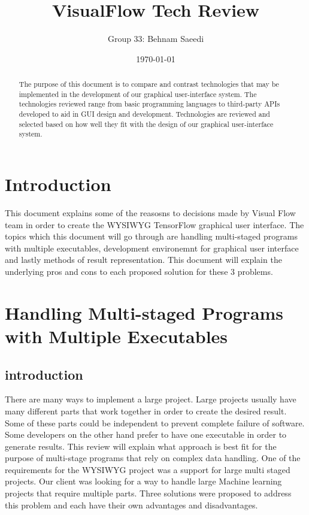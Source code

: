 \documentclass[journal,10pt,onecolumn,compsoc]{IEEEtran} \usepackage[margin=1.0in]{geometry} \usepackage{pdfpages} \usepackage{graphicx}
\title{VisualFlow Tech Review}
\author{Group 33: Behnam Saeedi}
\date{\today}
\begin{document}
\maketitle
\begin{abstract}
The purpose of this document is to compare and contrast technologies that may be implemented in the development of our graphical user-interface system. 
The technologies reviewed range from basic programming languages to third-party APIs developed to aid in GUI design and development.
Technologies are reviewed and selected based on how well they fit with the design of our graphical user-interface system.
\end{abstract}
\newpage
\tableofcontents
\newpage
\section{Introduction}
This document explains some of the reasosns to decisions made by Visual Flow team in order to create the WYSIWYG TensorFlow graphical user interface.
The topics which this document will go through are handling multi-staged programs with multiple executables, 
development environemnt for graphical user interface and lastly methods of result representation.
This document will explain the underlying pros and cons to each proposed solution for these 3 problems.

\section{Handling Multi-staged Programs with Multiple Executables}
\subsection{introduction}
There are many ways to implement a large project. 
Large projects usually have many different parts that work together in order to create the desired result. 
Some of these parts could be independent to prevent complete failure of software. 
Some developers on the other hand prefer to have one executable in order to generate results. 
This review will explain what approach is best fit for the purpose of multi-stage programs that rely on complex data handling. 
One of the requirements for the WYSIWYG project was a support for large multi staged projects. 
Our client was looking for a way to handle large Machine learning projects that require multiple parts. 
Three solutions were proposed to address this problem and each have their own advantages and disadvantages.
\end{document}
